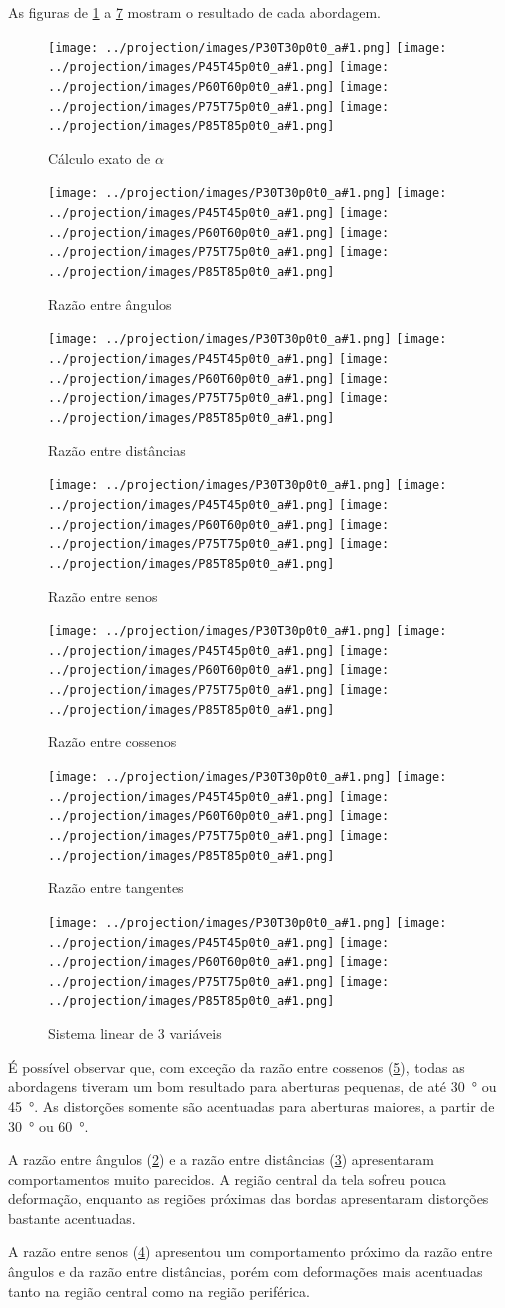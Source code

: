 \documentclass[brazil,pagestart=firstchapter]{abnt}
\newcommand*{\resultadoimagens}[1]{
	\texttt{[image: ../projection/images/P30T30p0t0\_a\#1.png]}
	\texttt{[image: ../projection/images/P45T45p0t0\_a\#1.png]}
	\texttt{[image: ../projection/images/P60T60p0t0\_a\#1.png]}
	\texttt{[image: ../projection/images/P75T75p0t0\_a\#1.png]}
	\texttt{[image: ../projection/images/P85T85p0t0\_a\#1.png]}
}
\begin{document}
As figuras de \ref{fig:resultado_exact} a \ref{fig:resultado_lineq} mostram
o resultado de cada abordagem.

\begin{figure}
\centering
\resultadoimagens{12}
\caption{Cálculo exato de $\alpha$}
\label{fig:resultado_exact}
\end{figure}

\begin{figure}
\centering
\resultadoimagens{7}
\caption{Razão entre ângulos}
\label{fig:resultado_angulo}
\end{figure}

\begin{figure}
\centering
\resultadoimagens{11}
\caption{Razão entre distâncias}
\label{fig:resultado_dist}
\end{figure}

\begin{figure}
\centering
\resultadoimagens{9}
\caption{Razão entre senos}
\label{fig:resultado_sin}
\end{figure}


\begin{figure}
\centering
\resultadoimagens{8}
\caption{Razão entre cossenos}
\label{fig:resultado_cos}
\end{figure}

\begin{figure}
\centering
\resultadoimagens{10}
\caption{Razão entre tangentes}
\label{fig:resultado_tan}
\end{figure}

\begin{figure}
\centering
\resultadoimagens{13}
\caption{Sistema linear de 3 variáveis}
\label{fig:resultado_lineq}
\end{figure}

É possível observar que, com exceção da razão entre cossenos
(\ref{fig:resultado_cos}), todas as abordagens tiveram um bom resultado para
aberturas pequenas, de até \SI{30}{\degree} ou \SI{45}{\degree}. As
distorções somente são acentuadas para aberturas maiores, a partir de
\SI{30}{\degree} ou \SI{60}{\degree}.

A razão entre ângulos (\ref{fig:resultado_angulo}) e a razão entre
distâncias (\ref{fig:resultado_dist}) apresentaram comportamentos muito
parecidos. A região central da tela sofreu pouca deformação, enquanto as
regiões próximas das bordas apresentaram distorções bastante acentuadas.

A razão entre senos (\ref{fig:resultado_sin}) apresentou um comportamento
próximo da razão entre ângulos e da razão entre distâncias, porém com
deformações mais acentuadas tanto na região central como na região
periférica.
\end{document}
